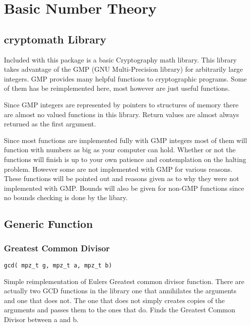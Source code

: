 

\chapter{Basic Number Theory}

\section{cryptomath Library}

Included with this package is a basic Cryptography math library. 
This library takes advantage of the GMP (GNU Multi-Precision library) for arbitrarily large integers.
GMP provides many helpful functions to cryptographic programs. 
Some of them has be reimplemented here, most however are just useful functions.

Since GMP integers are represented by pointers to structures of memory there are almost no valued functions in this library.
Return values are almost always returned as the first argument.

Since most functions are implemented fully with GMP integers most of them will function with numbers as big as your computer can hold.
Whether or not the functions will finish is up to your own patience and contemplation on the halting problem.
However some are not implemented with GMP for various reasons.
These functions will be pointed out and reasons given as to why they were not implemented with GMP.
Bounds will also be given for non-GMP functions since no bounds checking is done by the libary.

\section{Generic Function}
\subsection{Greatest Common Divisor} 
\begin{verbatim}
gcd( mpz_t g, mpz_t a, mpz_t b)
\end{verbatim}

Simple reimplementation of Eulers Greatest common divisor function.
There are actually two GCD functions in the library one that annihilates the arguments and one that does not.
The one that does not simply creates copies of the arguments and passes them to the ones that do.
Finds the Greatest Common Divisor between a and b.


